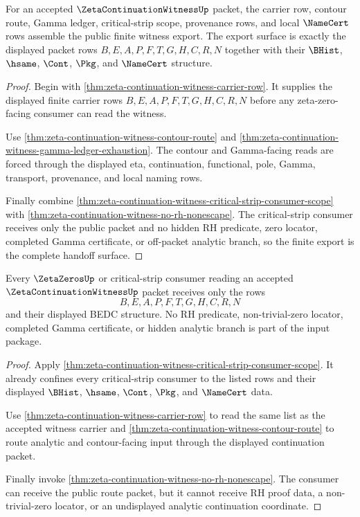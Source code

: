 \begin{theorem}
\label{thm:zeta-continuation-witness-public-export}
For an accepted $\ZetaContinuationWitnessUp$ packet, the carrier row, contour route, Gamma ledger, critical-strip scope, provenance rows, and local $\NameCert$ rows assemble the public finite witness export. The export surface is exactly the displayed packet rows $B,E,A,P,F,T,G,H,C,R,N$ together with their $\BHist$, $\hsame$, $\Cont$, $\Pkg$, and $\NameCert$ structure.
\end{theorem}
\begin{proof}
Begin with \autoref{thm:zeta-continuation-witness-carrier-row}. It supplies the displayed finite carrier rows $B,E,A,P,F,T,G,H,C,R,N$ before any zeta-zero-facing consumer can read the witness.

Use \autoref{thm:zeta-continuation-witness-contour-route} and \autoref{thm:zeta-continuation-witness-gamma-ledger-exhaustion}. The contour and Gamma-facing reads are forced through the displayed eta, continuation, functional, pole, Gamma, transport, provenance, and local naming rows.

Finally combine \autoref{thm:zeta-continuation-witness-critical-strip-consumer-scope} with \autoref{thm:zeta-continuation-witness-no-rh-nonescape}. The critical-strip consumer receives only the public packet and no hidden RH predicate, zero locator, completed Gamma certificate, or off-packet analytic branch, so the finite export is the complete handoff surface.
\end{proof}

\begin{theorem}
\label{thm:zeta-continuation-witness-zero-route-input-package}
Every $\ZetaZerosUp$ or critical-strip consumer reading an accepted $\ZetaContinuationWitnessUp$ packet receives only the rows
$$
B,E,A,P,F,T,G,H,C,R,N
$$
and their displayed BEDC structure. No RH predicate, non-trivial-zero locator, completed Gamma certificate, or hidden analytic branch is part of the input package.
\end{theorem}
\begin{proof}
Apply \autoref{thm:zeta-continuation-witness-critical-strip-consumer-scope}. It already confines every critical-strip consumer to the listed rows and their displayed $\BHist$, $\hsame$, $\Cont$, $\Pkg$, and $\NameCert$ data.

Use \autoref{thm:zeta-continuation-witness-carrier-row} to read the same list as the accepted witness carrier and \autoref{thm:zeta-continuation-witness-contour-route} to route analytic and contour-facing input through the displayed continuation packet.

Finally invoke \autoref{thm:zeta-continuation-witness-no-rh-nonescape}. The consumer can receive the public route packet, but it cannot receive RH proof data, a non-trivial-zero locator, or an undisplayed analytic continuation coordinate.
\end{proof}

